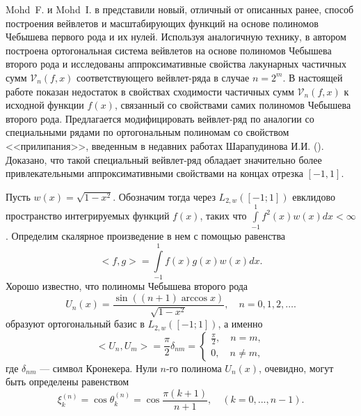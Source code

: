 Mohd~F. и Mohd~I. в \cite{sms10}
представили новый, отличный от описанных ранее, способ построения вейвлетов и масштабирующих функций на основе полиномов Чебышева первого рода и их нулей. Используя аналогичную технику, в \cite{sms11}
автором построена ортогональная система вейвлетов на основе полиномов Чебышева второго рода и исследованы аппроксимативные свойства лакунарных частичных сумм $\mathcal{V}_n(f,x)$ соответствующего вейвлет-ряда в случае $n = 2^m$.
В настоящей работе показан недостаток в свойствах сходимости частичных сумм $\mathcal{V}_n(f,x)$ к исходной функции $f(x)$, связанный со свойствами самих полиномов Чебышева второго рода. Предлагается модифицировать вейвлет-ряд по аналогии со специальными рядами по ортогональным полиномам со свойством <<прилипания>>, введенным в недавних работах Шарапудинова И.И.
(\cite{sms12}\cite{sms13}). Доказано, что такой специальный вейвлет-ряд обладает значительно более привлекательными аппроксимативными свойствами на концах отрезка $[-1, 1]$.


Пусть $w(x) = \sqrt{1-x^2}$. Обозначим тогда через $L_{2, w}([-1; 1])$ евклидово пространство интегрируемых функций $f(x)$, таких что
$\int\limits_{-1}^{1} f^2(x)w(x)dx < \infty$.
Определим скалярное произведение в нем с помощью равенства
\begin{equation}
\label{scal}
<f, g> = \int\limits_{-1}^{1} f(x) g(x) w(x) dx.
\end{equation}
Хорошо известно, что полиномы Чебышева второго рода
 \begin{equation*}
\label{u2direct}
U_n(x) = \frac{\sin((n+1)\arccos{x})}{\sqrt{1-x^2}}, \quad n = 0,1,2, \ldots .
\end{equation*}
образуют ортогональный базис в $L_{2, w}([-1; 1])$, а именно
\begin{equation}
\label{sms1ortho}
<U_n, U_m> = \frac{\pi}{2}\delta_{nm} =
\left\{
\begin{aligned}
\frac{\pi}{2}, \quad n=m,\\
0, \quad  n \neq m,
\end{aligned}
\right.
\end{equation}
где $\delta_{nm}$ --- символ Кронекера.
Нули $n$-го полинома $U_n(x)$, очевидно, могут быть определены равенством
\begin{equation*}
\label{sms1zeros}
\xi_{k}^{(n)} = \cos{\theta_{k}^{(n)}} =  \cos{\frac{\pi (k+1)}{n+1}}, \quad (k = 0,...,n-1).
\end{equation*}



